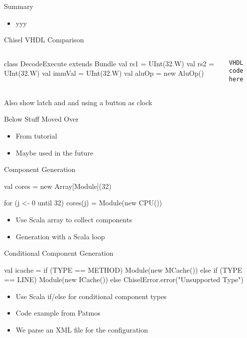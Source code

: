 \begin{frame}[fragile]{Summary}
\begin{itemize}
\item yyy
\end{itemize}
\end{frame}


\begin{frame}[fragile]{Chisel VHDL Comparison}
\begin{columns}
\begin{chisel}
class DecodeExecute extends Bundle {
  val rs1 = UInt(32.W)
  val rs2 = UInt(32.W)
  val immVal = UInt(32.W)
  val aluOp = new AluOp()
}
\end{chisel}
\begin{verbatim}
VHDL code here
\end{verbatim}
\end{columns}
Also show latch and and using a button as clock
\end{frame}

\begin{frame}[fragile]{Below Stuff Moved Over}
\begin{itemize}
\item From tutorial
\item Maybe used in the future
\end{itemize}
\end{frame}



\begin{frame}[fragile]{Component Generation}
\begin{chisel}
val cores = new Array[Module](32)

for (j <- 0 until 32)
  cores(j) = Module(new CPU())
\end{chisel}
\begin{itemize}
\item Use Scala array to collect components
\item Generation with a Scala loop
\end{itemize}
\end{frame}

\begin{frame}[fragile]{Conditional Component Generation}
\begin{chisel}
val icache =
  if (TYPE == METHOD)
    Module(new MCache())
  else if (TYPE == LINE)
    Module(new ICache())
  else
    ChiselError.error("Unsupported Type")
\end{chisel}
\begin{itemize}
\item Use Scala if/else for conditional component types
\item Code example from Patmos
\item We parse an XML file for the configuration
\end{itemize}
\end{frame}

